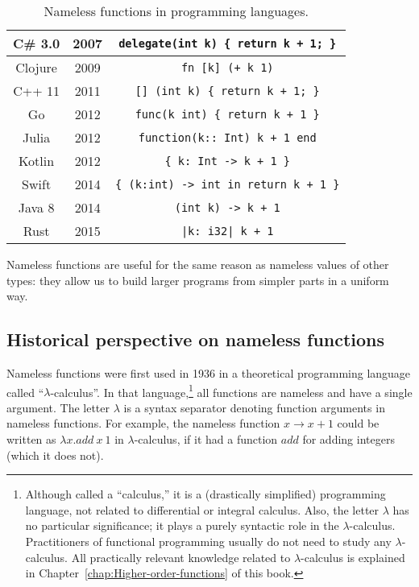 \begin{wraptable}{r}{0.6\columnwidth}
\begin{centering}
\begin{tabular}{|c|c|c|}
\hline 
{\footnotesize{}C\# 3.0} & {\footnotesize{}2007} & \lstinline!delegate(int k) { return k + 1; }!\tabularnewline
\hline 
{\footnotesize{}Clojure} & {\footnotesize{}2009} & \lstinline!fn [k] (+ k 1)!\tabularnewline
\hline 
{\footnotesize{}C++ 11} & {\footnotesize{}2011} & \lstinline![] (int k) { return k + 1; }!\tabularnewline
\hline 
{\footnotesize{}Go} & {\footnotesize{}2012} & \lstinline!func(k int) { return k + 1 }!\tabularnewline
\hline 
{\footnotesize{}Julia} & {\footnotesize{}2012} & \lstinline!function(k:: Int) k + 1 end!\tabularnewline
\hline 
{\footnotesize{}Kotlin} & {\footnotesize{}2012} & \lstinline!{ k: Int -> k + 1 }!\tabularnewline
\hline 
{\footnotesize{}Swift} & {\footnotesize{}2014} & \lstinline!{ (k:int) -> int in return k + 1 }!\tabularnewline
\hline 
{\footnotesize{}Java 8} & {\footnotesize{}2014} & \lstinline!(int k) -> k + 1!\tabularnewline
\hline 
{\footnotesize{}Rust} & {\footnotesize{}2015} & \lstinline!|k: i32| k + 1!\tabularnewline
\hline 
\end{tabular}
\par\end{centering}
\caption{Nameless functions in programming languages.\label{lambda-functions-table}}
\vspace{-3\baselineskip}
\end{wraptable}%

\noindent Nameless functions are useful for the same reason as nameless
values of other types: they allow us to build larger programs from
simpler parts in a uniform way.

\subsection{Historical perspective on nameless functions}

Nameless functions were first used in 1936 in a theoretical programming
language called \textsf{``}$\lambda$-calculus\textsf{''}.
In that language,\footnote{Although called a \textsf{``}calculus,\textsf{''} it is a (drastically simplified)
programming language, not related to differential or integral calculus.
Also, the letter $\lambda$ has no particular significance; it plays
a purely syntactic role in the $\lambda$-calculus. Practitioners
of functional programming usually do not need to study any $\lambda$-calculus.
All practically relevant knowledge related to $\lambda$-calculus
is explained in Chapter~\ref{chap:Higher-order-functions} of this
book.} all functions are nameless and have a single argument. The letter
$\lambda$ is a syntax separator denoting function arguments in nameless
functions. For example, the nameless function $x\rightarrow x+1$
could be written as $\lambda x.add~x~1$ in $\lambda$-calculus, if
it had a function $add$ for adding integers (which it does not).

